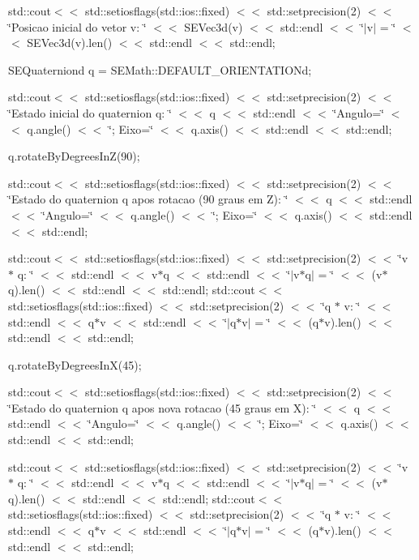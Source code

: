 std\+::cout$<$$<$ std\+::setiosflags(std\+::ios\+::fixed) $<$$<$ std\+::setprecision(2) $<$$<$ \char`\"{}\+Posicao inicial do vetor v\+: \char`\"{} $<$$<$ S\+E\+Vec3d(v) $<$$<$ std\+::endl $<$$<$ \char`\"{}$\vert$v$\vert$ = \char`\"{} $<$$<$ S\+E\+Vec3d(v).len() $<$$<$ std\+::endl $<$$<$ std\+::endl;

S\+E\+Quaterniond q = S\+E\+Math\+::\+D\+E\+F\+A\+U\+L\+T\+\_\+\+O\+R\+I\+E\+N\+T\+A\+T\+I\+O\+Nd;

std\+::cout$<$$<$ std\+::setiosflags(std\+::ios\+::fixed) $<$$<$ std\+::setprecision(2) $<$$<$ \char`\"{}\+Estado inicial do quaternion q\+: \char`\"{} $<$$<$ q $<$$<$ std\+::endl $<$$<$ \char`\"{}\+Angulo=\char`\"{} $<$$<$ q.\+angle() $<$$<$ \char`\"{}; Eixo=\char`\"{} $<$$<$ q.\+axis() $<$$<$ std\+::endl $<$$<$ std\+::endl;

q.\+rotate\+By\+Degrees\+In\+Z(90);

std\+::cout$<$$<$ std\+::setiosflags(std\+::ios\+::fixed) $<$$<$ std\+::setprecision(2) $<$$<$ \char`\"{}\+Estado do quaternion q apos rotacao (90 graus em Z)\+: \char`\"{} $<$$<$ q $<$$<$ std\+::endl $<$$<$ \char`\"{}\+Angulo=\char`\"{} $<$$<$ q.\+angle() $<$$<$ \char`\"{}; Eixo=\char`\"{} $<$$<$ q.\+axis() $<$$<$ std\+::endl $<$$<$ std\+::endl;

std\+::cout$<$$<$ std\+::setiosflags(std\+::ios\+::fixed) $<$$<$ std\+::setprecision(2) $<$$<$ \char`\"{}v $\ast$ q\+: \char`\"{} $<$$<$ std\+::endl $<$$<$ v$\ast$q $<$$<$ std\+::endl $<$$<$ \char`\"{}$\vert$v$\ast$q$\vert$ = \char`\"{} $<$$<$ (v$\ast$q).len() $<$$<$ std\+::endl $<$$<$ std\+::endl; std\+::cout$<$$<$ std\+::setiosflags(std\+::ios\+::fixed) $<$$<$ std\+::setprecision(2) $<$$<$ \char`\"{}q $\ast$ v\+: \char`\"{} $<$$<$ std\+::endl $<$$<$ q$\ast$v $<$$<$ std\+::endl $<$$<$ \char`\"{}$\vert$q$\ast$v$\vert$ = \char`\"{} $<$$<$ (q$\ast$v).len() $<$$<$ std\+::endl $<$$<$ std\+::endl;

q.\+rotate\+By\+Degrees\+In\+X(45);

std\+::cout$<$$<$ std\+::setiosflags(std\+::ios\+::fixed) $<$$<$ std\+::setprecision(2) $<$$<$ \char`\"{}\+Estado do quaternion q apos nova rotacao (45 graus em X)\+: \char`\"{} $<$$<$ q $<$$<$ std\+::endl $<$$<$ \char`\"{}\+Angulo=\char`\"{} $<$$<$ q.\+angle() $<$$<$ \char`\"{}; Eixo=\char`\"{} $<$$<$ q.\+axis() $<$$<$ std\+::endl $<$$<$ std\+::endl;

std\+::cout$<$$<$ std\+::setiosflags(std\+::ios\+::fixed) $<$$<$ std\+::setprecision(2) $<$$<$ \char`\"{}v $\ast$ q\+: \char`\"{} $<$$<$ std\+::endl $<$$<$ v$\ast$q $<$$<$ std\+::endl $<$$<$ \char`\"{}$\vert$v$\ast$q$\vert$ = \char`\"{} $<$$<$ (v$\ast$q).len() $<$$<$ std\+::endl $<$$<$ std\+::endl; std\+::cout$<$$<$ std\+::setiosflags(std\+::ios\+::fixed) $<$$<$ std\+::setprecision(2) $<$$<$ \char`\"{}q $\ast$ v\+: \char`\"{} $<$$<$ std\+::endl $<$$<$ q$\ast$v $<$$<$ std\+::endl $<$$<$ \char`\"{}$\vert$q$\ast$v$\vert$ = \char`\"{} $<$$<$ (q$\ast$v).len() $<$$<$ std\+::endl $<$$<$ std\+::endl;

